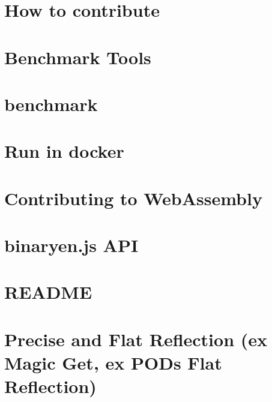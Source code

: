 \documentclass[twoside]{book}
\newcommand{\+}{\discretionary{\mbox{\scriptsize$\hookleftarrow$}}{}{}}
\begin{document}
\chapter{How to contribute}
\label{md_contracts_libc_09_09_upstream_utils_google-benchmark__c_o_n_t_r_i_b_u_t_i_n_g}

\chapter{Benchmark Tools}
\label{md_contracts_libc_09_09_upstream_utils_google-benchmark_docs_tools}

\chapter{benchmark}
\label{md_contracts_libc_09_09_upstream_utils_google-benchmark__r_e_a_d_m_e}

\chapter{Run in docker}
\label{md__docker__r_e_a_d_m_e}

\chapter{Contributing to Web\+Assembly}
\label{md_externals_binaryen__contributing}

\chapter{binaryen.\+js A\+PI}
\label{md_externals_binaryen_docs_binaryen_8js}

\chapter{R\+E\+A\+D\+ME}
\label{md_externals_binaryen__r_e_a_d_m_e}

\chapter{Precise and Flat Reflection (ex Magic Get, ex P\+O\+Ds Flat Reflection)}
\label{md_externals_magic_get__r_e_a_d_m_e}

\end{document}
